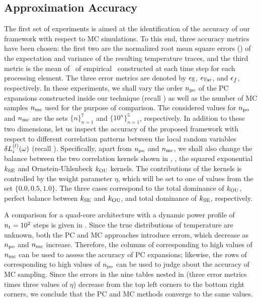 \subsection{Approximation Accuracy} 
The first set of experiments is aimed at the identification of the accuracy of our framework with respect to MC simulations.
To this end, three accuracy metrics have been chosen: the first two are the normalized root mean square errors (\nrmses) of the expectation and variance of the resulting temperature traces, and the third metric is the mean of \nrmses\ of empirical \pdfs\ constructed at each time step for each processing element.
The three error metrics are denoted by $\epsilon_\mathbb{E}$, $\epsilon_{\mathbb{V}\text{ar}}$, and $\epsilon_f$, respectively.
In these experiments, we shall vary the order ${n_\text{po}}$ of the PC expansions constructed inside our technique (recall ) as well as the number of MC samples ${n_\text{mc}}$ used for the purpose of comparison.
The considered values for ${n_\text{po}}$ and ${n_\text{mc}}$ are the sets $\{ n \}_{n = 1}^7$ and $\{ 10^n \}_{n = 1}^5$, respectively.
In addition to these two dimensions, let us inspect the accuracy of the proposed framework with respect to different correlation patterns between the local random variables $\delta L^{(l)}_i(\omega)$ (recall ).
Specifically, apart from ${n_\text{po}}$ and ${n_\text{mc}}$, we shall also change the balance between the two correlation kernels shown in , \ie, the squared exponential $\fCorr_\SE$ and Ornstein-Uhlenbeck $\fCorr_\OU$ kernels.
The contributions of the kernels is controlled by the weight parameter $\eta$, which will be set to one of values from the set $\{ 0.0, 0.5, 1.0 \}$.
The three cases correspond to the total dominance of $\fCorr_\OU$, perfect balance between $\fCorr_\SE$ and $\fCorr_\OU$, and total dominance of $\fCorr_\SE$, respectively.


A comparison for a quad-core architecture with a dynamic power profile of ${n_\text{t}} = 10^2$ steps is given in .
Since the true distributions of temperature are unknown, both the PC and MC approaches introduce errors, which decrease as ${n_\text{po}}$ and ${n_\text{mc}}$ increase.
Therefore, the columns of  corresponding to high values of ${n_\text{mc}}$ can be used to assess the accuracy of PC expansions; likewise, the rows of  corresponding to high values of ${n_\text{po}}$ can be used to judge about the accuracy of MC sampling.
Since the errors in the nine tables nested in  (three error metrics times three values of $\eta$) decrease from the top left corners to the bottom right corners, we conclude that the PC and MC methods converge to the same values.


